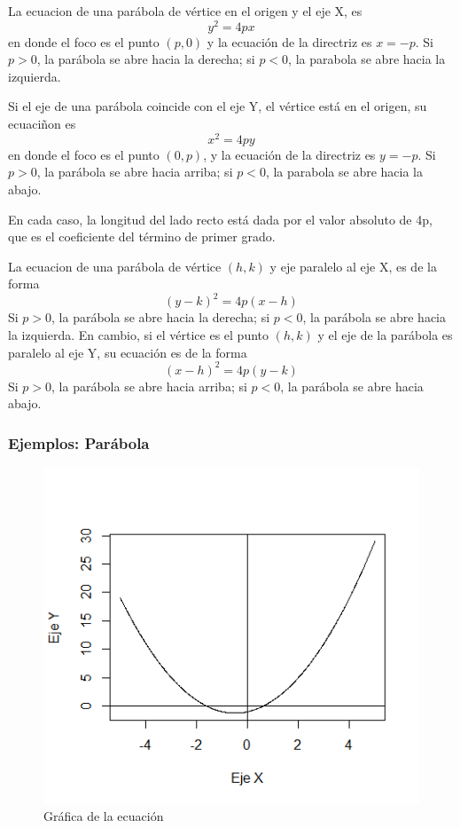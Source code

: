 \documentclass[12pt,a4paper]{article} %
\begin{document}
La ecuacion de una parábola de vértice en el origen y el eje X, es 
$$y^2 = 4px$$
en donde el foco es el punto $(p,0)$ y la ecuación de la directriz es $x = -p$. Si $p > 0$, la parábola se abre hacia la derecha; si $p < 0$, la parabola se abre hacia la izquierda.

Si el eje de una parábola coincide con el eje Y, el vértice está en el origen, su ecuaciñon es 
$$x^2 = 4py$$
en donde el foco es el punto $(0,p)$, y la ecuación de la directriz es $y = -p$. Si $p > 0$, la parábola se abre hacia arriba; si $p < 0$, la parabola se abre hacia la abajo.

En cada caso, la longitud del lado recto está dada por el valor absoluto de 4p, que es el coeficiente del término de primer grado.

La ecuacion de una parábola de vértice $(h,k)$ y eje paralelo al eje X, es de la forma
$$(y - k)^2 = 4p(x - h)$$
Si $p > 0$, la parábola se abre hacia la derecha; si $p < 0$, la parábola se abre hacia la izquierda.
En cambio, si el vértice es el punto $(h,k)$ y el eje de la parábola es paralelo al eje Y, su ecuación es de la forma 
$$(x - h)^2 = 4p(y - k)$$
Si $p > 0$, la parábola se abre hacia arriba; si $p < 0$, la parábola se abre hacia abajo.

\subsubsection{Ejemplos: Parábola}

\begin{figure}[h]
\centering
\includegraphics[scale=0.8]{Parabola1}
\caption{Gráfica de la ecuación }
\label{fig:Parabola}
\end{figure}
\end{document}
